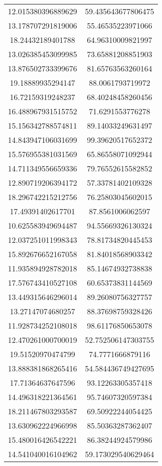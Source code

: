 \begin{table}
\begin{tabular}{cc}
12.015380396889629 & 59.435643677806475 \\
13.178707291819006 & 55.46535223971066 \\
18.24432189401788 & 64.96310009821997 \\
13.026385453099985 & 73.65881208851903 \\
13.876502733399676 & 81.65763563260164 \\
19.18889935294147 & 88.0061793719972 \\
16.72159319248237 & 68.40248458260456 \\
16.488967931515752 & 71.6291553776278 \\
15.156342788574811 & 89.14033249631497 \\
14.843947106031699 & 99.39620517652372 \\
15.576955381031569 & 65.86558071092944 \\
14.711349556659336 & 79.76552615582852 \\
12.890719206394172 & 57.33781402109328 \\
18.296742215212756 & 76.25803045602015 \\
17.49391402617701 & 87.8561006062597 \\
10.625583949694487 & 94.55669326130324 \\
12.037251011998343 & 78.81734820445453 \\
15.892676652167058 & 81.84018568903342 \\
11.935894928782018 & 85.14674932738838 \\
17.576743410527108 & 60.65373831144569 \\
13.449315646296014 & 89.26080756327757 \\
13.27147074680257 & 88.37698759328426 \\
11.928734252108018 & 98.61176850653078 \\
12.470261000700019 & 52.752506147303755 \\
19.51520970474799 & 74.7771666879116 \\
13.888381868265416 & 54.584436749427695 \\
17.71364637647596 & 93.12263305357418 \\
14.496318221364561 & 95.74607320597384 \\
18.211467803293587 & 69.50922244054425 \\
13.630962224966998 & 85.50363287362407 \\
15.480016426542221 & 86.38244924579986 \\
14.541040016104962 & 59.173029540629464 \\

\end{tabular}
\end{table}

